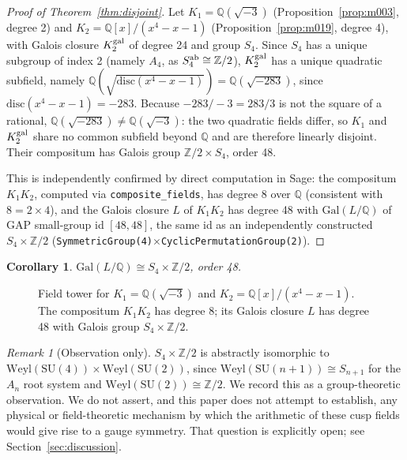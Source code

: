 \documentclass[11pt,a4paper]{article}
\newtheorem{corollary}[theorem]{Corollary}
\theoremstyle{definition}
\theoremstyle{remark}
\newtheorem{remark}[theorem]{Remark}
\newcommand{\Z}{\mathbb{Z}}
\newcommand{\Q}{\mathbb{Q}}
\newcommand{\Gal}{\mathrm{Gal}}
\newcommand{\SU}{\mathrm{SU}}
\newcommand{\Weyl}{\mathrm{Weyl}}
\newcommand{\disc}{\mathrm{disc}}
\begin{document}
\begin{proof}[Proof of Theorem~\ref{thm:disjoint}]
Let $K_1=\Q(\sqrt{-3})$ (Proposition~\ref{prop:m003}, degree 2) and
$K_2=\Q[x]/(x^4-x-1)$ (Proposition~\ref{prop:m019}, degree 4), with
Galois closure $K_2^{\rm gal}$ of degree 24 and group $S_4$. Since
$S_4$ has a unique subgroup of index 2 (namely $A_4$, as
$S_4^{\rm ab}\cong\Z/2$), $K_2^{\rm gal}$ has a unique quadratic
subfield, namely $\Q(\sqrt{\disc(x^4-x-1)})=\Q(\sqrt{-283})$, since
$\disc(x^4-x-1)=-283$. Because $-283/-3=283/3$ is not the square of
a rational, $\Q(\sqrt{-283})\ne\Q(\sqrt{-3})$: the two quadratic
fields differ, so $K_1$ and $K_2^{\rm gal}$ share no common
subfield beyond $\Q$ and are therefore linearly disjoint. Their
compositum has Galois group $\Z/2\times S_4$, order 48.

This is independently confirmed by direct computation in Sage: the
compositum $K_1K_2$, computed via \texttt{composite\_fields}, has
degree 8 over $\Q$ (consistent with $8=2\times4$), and the Galois
closure $L$ of $K_1K_2$ has degree 48 with $\Gal(L/\Q)$ of GAP
small-group id $[48,48]$, the same id as an independently
constructed $S_4\times\Z/2$
(\texttt{SymmetricGroup(4)}$\times$\texttt{CyclicPermutationGroup(2)}).
\end{proof}

\begin{corollary}\label{cor:group}
$\Gal(L/\Q)\cong S_4\times\Z/2$, order 48.
\end{corollary}

\begin{figure}[htbp]
\centering
{}
\caption{Field tower for $K_1=\Q(\sqrt{-3})$ and $K_2=\Q[x]/(x^4-x-1)$.
The compositum $K_1K_2$ has degree 8; its Galois closure $L$ has
degree 48 with Galois group $S_4\times\Z/2$.}
\label{fig:tower}
\end{figure}

\begin{remark}[Observation only]
$S_4\times\Z/2$ is abstractly isomorphic to
$\Weyl(\SU(4))\times\Weyl(\SU(2))$, since $\Weyl(\SU(n+1))\cong
S_{n+1}$ for the $A_n$ root system and $\Weyl(\SU(2))\cong\Z/2$.
We record this as a group-theoretic observation. We do not assert,
and this paper does not attempt to establish, any physical or
field-theoretic mechanism by which the arithmetic of these cusp
fields would give rise to a gauge symmetry. That question is
explicitly open; see Section~\ref{sec:discussion}.
\end{remark}
\end{document}
